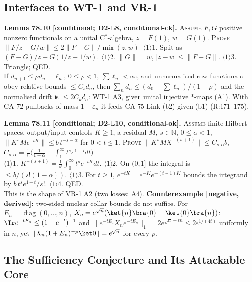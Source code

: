 \subsection{Interfaces to WT-1 and VR-1}

\textbf{Lemma 78.10 [conditional; D2-L8, conditional-ok].}  \textsc{Assume} \(F,G\) positive nonzero
functionals on a unital C\(^*\)-algebra, \(z=F(1)\), \(w=G(1)\).  \textsc{Prove}
\(\|F/z-G/w\|\le2\|F-G\|/\min(z,w)\).  \(\langle1\rangle1\). Split as \((F-G)/z+G(1/z-1/w)\).
\(\langle1\rangle2\). \(\|G\|=w\), \(|z-w|\le\|F-G\|\).  \(\langle1\rangle3\). Triangle; QED.\\ If
\(d_{n+1}\le\rho d_n+\ell_n\), \(0\le\rho<1\), \(\sum\ell_n<\infty\), and unnormalised row
functionals obey relative bounds \(\le C_kd_n\), then \(\sum_nd_n\le(d_0+\sum\ell_n)/(1-\rho)\) and
the normalised drift is \(\le2C_kd_n\): WT-1 A3, given unital injective \(*\)-maps (A1). With CA-72
pullbacks of mass \(1-\varepsilon_n\) it feeds CA-75 Link (b2) given (b1) (R:171--175).

\textbf{Lemma 78.11 [conditional; D2-L10, conditional-ok].}  \textsc{Assume} finite Hilbert spaces,
output/input controls \(K\ge1\), a residual \(M\), \(s\in\mathbb N\), \(0\le\alpha<1\),
\(\|K^sMe^{-tK}\|\le b\,t^{-s-\alpha}\) for \(0<t\le1\).  \textsc{Prove} \(\|K^sMK^{-(s+1)}\|\le
C_{s,\alpha}b\), \(C_{s,\alpha}=\tfrac1{s!}\big(\tfrac1{1-\alpha}+\int_1^\infty
t^se^{1-t}dt\big)\).\\ \(\langle1\rangle1\). \(K^{-(s+1)}=\tfrac1{s!}\int_0^\infty t^se^{-tK}dt\).
\(\langle1\rangle2\). On \((0,1]\) the integral is \(\le b/(s!(1-\alpha))\). \(\langle1\rangle3\).
For \(t\ge1\), \(e^{-tK}=e^{-K}e^{-(t-1)K}\) bounds the integrand by \(b\,t^se^{1-t}/s!\).
\(\langle1\rangle4\). QED.\\ This is the shape of VR-1 A2 (two losses: A4).  \textbf{Counterexample
[negative, derived]:} two-sided nuclear collar bounds do not suffice.  For
\(E_n=\operatorname{diag}(0,\dots,n)\), \(X_n=e^{\sqrt n}(\ket{n}\bra{0}+\ket{0}\bra{n})\): \(\Tr
e^{-tE_n}\le(1-e^{-t})^{-1}\) and \(\|e^{-tE_n}X_ne^{-tE_n}\|_1=2e^{\sqrt n-tn}\le2e^{1/(4t)}\)
uniformly in \(n\), yet \(\|X_n(1+E_n)^{-p}\ket0\|=e^{\sqrt n}\) for every \(p\).

\subsection{The Sufficiency Conjecture and Its Attackable Core}

